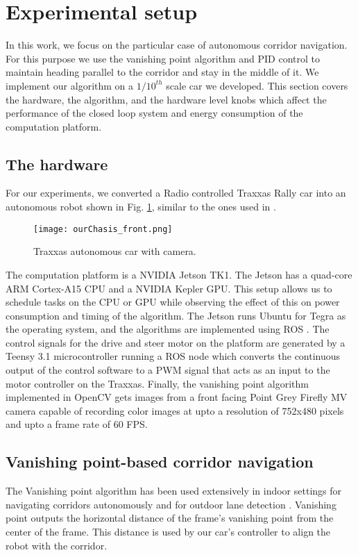 \section{Experimental setup}

In this work, we focus on the particular case of autonomous corridor navigation. 
For this purpose we use the vanishing point algorithm and PID control to maintain heading parallel to the corridor and stay in the middle of it. We implement our algorithm on a $1/10^{th}$ scale car we developed. This section covers the hardware, the algorithm, and the hardware level knobs which affect the performance of the closed loop system and energy consumption of the computation platform.

\subsection{The hardware}

For our experiments, we converted a Radio controlled Traxxas Rally car into an autonomous robot shown in Fig. \ref{fig:traxxas}, similar to the ones used in \cite{racecar_mit}.
\begin{figure}
	\centering
	\label{fig:traxxas}
	\texttt{[image: ourChasis\_front.png]}
	\caption{Traxxas autonomous car with camera.}
\end{figure} 
The computation platform is a NVIDIA Jetson TK1. 
The Jetson has a quad-core ARM Cortex-A15 CPU and a NVIDIA Kepler GPU. 
This setup allows us to schedule tasks on the CPU or GPU while observing the effect of this on power consumption and timing of the algorithm. 
The Jetson runs Ubuntu for Tegra as the operating system, and the algorithms are implemented using ROS \cite{ros}. The control signals for the drive and steer motor on the platform are generated by a Teensy 3.1 microcontroller running a ROS node which converts the continuous output of the control software to a PWM signal that acts as an input to the motor controller on the Traxxas. 
Finally, the vanishing point algorithm implemented in OpenCV \cite{opencv} gets images from a front facing Point Grey Firefly MV camera capable of recording color images at upto a resolution of 752x480 pixels and upto a frame rate of 60 FPS. 

\subsection{Vanishing point-based corridor navigation}

The Vanishing point algorithm \cite{VP1} has been used extensively in indoor settings for navigating corridors autonomously \cite{VP2, VP3} and for outdoor lane detection \cite{gallagher2002ground}. 
Vanishing point outputs the horizontal distance of the frame's vanishing point from the center of the frame. 
This distance is used by our car's controller to align the robot with the corridor. 

